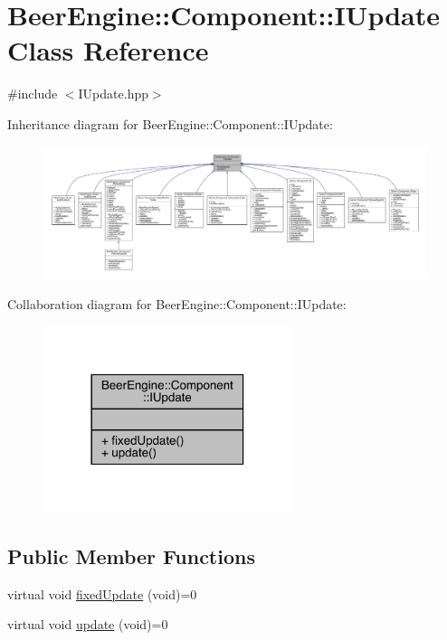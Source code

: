 \hypertarget{class_beer_engine_1_1_component_1_1_i_update}{}\section{Beer\+Engine\+:\+:Component\+:\+:I\+Update Class Reference}
\label{class_beer_engine_1_1_component_1_1_i_update}


{\ttfamily \#include $<$I\+Update.\+hpp$>$}



Inheritance diagram for Beer\+Engine\+:\+:Component\+:\+:I\+Update\+:\nopagebreak
\begin{figure}[H]
\begin{center}
\leavevmode
\includegraphics[width=350pt]{class_beer_engine_1_1_component_1_1_i_update__inherit__graph}
\end{center}
\end{figure}


Collaboration diagram for Beer\+Engine\+:\+:Component\+:\+:I\+Update\+:\nopagebreak
\begin{figure}[H]
\begin{center}
\leavevmode
\includegraphics[width=206pt]{class_beer_engine_1_1_component_1_1_i_update__coll__graph}
\end{center}
\end{figure}
\subsection*{Public Member Functions}
\begin{DoxyCompactItemize}
\item 
virtual void \mbox{\hyperlink{class_beer_engine_1_1_component_1_1_i_update_a615c127a4729f73713e5eaeee538854b}{fixed\+Update}} (void)=0
\item 
virtual void \mbox{\hyperlink{class_beer_engine_1_1_component_1_1_i_update_aeeda0aa303175720e449b4c51d9867dd}{update}} (void)=0
\end{DoxyCompactItemize}



